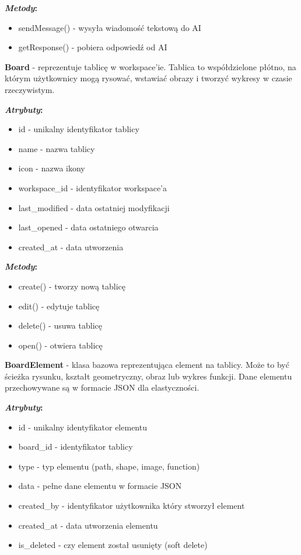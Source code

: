 \documentclass[12pt,a4paper]{article}
\begin{document}
\textbf{\textit{Metody}:}
\begin{itemize}[leftmargin=*]
    \item sendMessage() - wysyła wiadomość tekstową do AI
    \item getResponse() - pobiera odpowiedź od AI
\end{itemize}

\vspace{1em}

\textbf{Board} - reprezentuje tablicę w workspace'ie. Tablica to współdzielone płótno, na którym użytkownicy mogą rysować, wstawiać obrazy i tworzyć wykresy w czasie rzeczywistym.

\textbf{\textit{Atrybuty}:}
\begin{itemize}[leftmargin=*]
    \item id - unikalny identyfikator tablicy
    \item name - nazwa tablicy
    \item icon - nazwa ikony
    \item workspace\_id - identyfikator workspace'a
    \item last\_modified - data ostatniej modyfikacji
    \item last\_opened - data ostatniego otwarcia
    \item created\_at - data utworzenia
\end{itemize}

\textbf{\textit{Metody}:}
\begin{itemize}[leftmargin=*]
    \item create() - tworzy nową tablicę
    \item edit() - edytuje tablicę
    \item delete() - usuwa tablicę
    \item open() - otwiera tablicę
\end{itemize}

\vspace{1em}

\textbf{BoardElement} - klasa bazowa reprezentująca element na tablicy. Może to być ścieżka rysunku, kształt geometryczny, obraz lub wykres funkcji. Dane elementu przechowywane są w formacie JSON dla elastyczności.

\textbf{\textit{Atrybuty}:}
\begin{itemize}[leftmargin=*]
    \item id - unikalny identyfikator elementu
    \item board\_id - identyfikator tablicy
    \item type - typ elementu (path, shape, image, function)
    \item data - pełne dane elementu w formacie JSON
    \item created\_by - identyfikator użytkownika który stworzył element
    \item created\_at - data utworzenia elementu
    \item is\_deleted - czy element został usunięty (soft delete)
\end{itemize}
\end{document}
